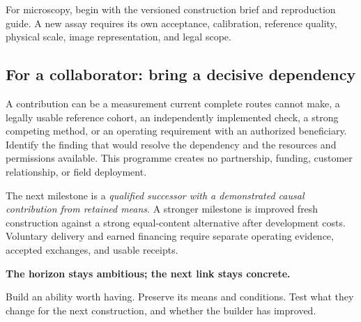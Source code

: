 For microscopy, begin with the versioned construction brief and reproduction guide. A new assay requires its own acceptance, calibration, reference quality, physical scale, image representation, and legal scope.

\subsection{For a collaborator: bring a decisive dependency}

A contribution can be a measurement current complete routes cannot make, a legally usable reference cohort, an independently implemented check, a strong competing method, or an operating requirement with an authorized beneficiary. Identify the finding that would resolve the dependency and the resources and permissions available. This programme creates no partnership, funding, customer relationship, or field deployment.

The next milestone is a \emph{qualified successor with a demonstrated causal contribution from retained means}. A stronger milestone is improved fresh construction against a strong equal-content alternative after development costs. Voluntary delivery and earned financing require separate operating evidence, accepted exchanges, and usable receipts.

\begin{thesisbox}
\textbf{The horizon stays ambitious; the next link stays concrete.}\par
Build an ability worth having. Preserve its means and conditions. Test what they change for the next construction, and whether the builder has improved.
\end{thesisbox}
